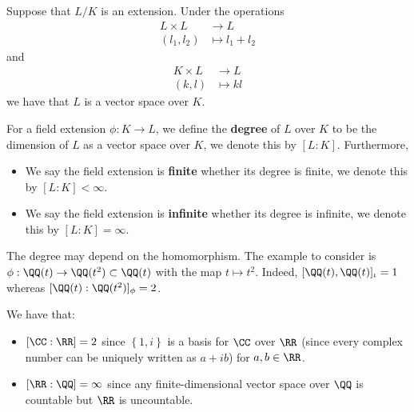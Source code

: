 \documentclass[12pt, a4paper]{article}
\begin{document}
\begin{theorem}
    Suppose that \(L/K\) is an extension. Under the operations
    \[\begin{aligned}
        L \times L &\to L \\
        (l_1,l_2) &\mapsto l_1+l_2 
    \end{aligned}\]
    and 
    \[\begin{aligned}
        K \times L &\to L \\
        (k,l) &\mapsto kl
    \end{aligned}\]
    we have that \(L\) is a vector space over \(K\).
\end{theorem}

\begin{definition}
    For a field extension \(\phi:K \to L\), we define the \textbf{degree} of \(L\) over \(K\) to be the dimension of \(L\) as a vector space over \(K\), we denote this by \([L:K]\). Furthermore,
    \begin{itemize}
        \item We say the field extension is \textbf{finite} whether its degree is finite, we denote this by \([L:K]<\infty\).
        \item We say the field extension is \textbf{infinite} whether its degree is infinite, we denote this by \([L:K]=\infty\).
    \end{itemize}
\end{definition}

\begin{mdremark}
    The degree may depend on the homomorphism. The example to consider is \(\phi:\QQ(t) \to \QQ(t^2)\subset \QQ(t)\) with the map \(t \mapsto t^2\). Indeed, \([\QQ(t),\QQ(t)]_{\iota}=1\) whereas \([\QQ(t):\QQ(t^2)]_{\phi}=2\).
\end{mdremark}

\begin{example}
    We have that: 
    \begin{itemize}
        \item \([\CC:\RR]=2\) since \(\left\{ 1,i \right\}\) is a basis for \(\CC\) over \(\RR\) (since every complex number can be uniquely written as \(a+ib\)) for \(a,b\in \RR\).
        \item \([\RR:\QQ] = \infty\) since any finite-dimensional vector space over \(\QQ\) is countable but \(\RR\) is uncountable.
    \end{itemize}
\end{example}
\end{document}
